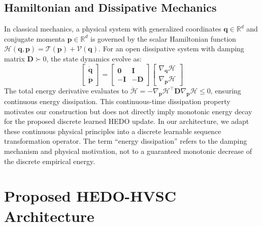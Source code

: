 \documentclass[pdflatex,sn-mathphys-num]{sn-jnl}%
\begin{document}
\subsection{Hamiltonian and Dissipative Mechanics}
In classical mechanics, a physical system with generalized coordinates $\mathbf{q} \in \mathbb{R}^d$ and conjugate momenta $\mathbf{p} \in \mathbb{R}^d$ is governed by the scalar Hamiltonian function $\mathcal{H}(\mathbf{q}, \mathbf{p}) = \mathcal{T}(\mathbf{p}) + \mathcal{V}(\mathbf{q})$. For an open dissipative system with damping matrix $\mathbf{D} \succ 0$, the state dynamics evolve as:
\begin{equation}
\begin{bmatrix} \dot{\mathbf{q}} \\ \dot{\mathbf{p}} \end{bmatrix} = \begin{bmatrix} \mathbf{0} & \mathbf{I} \\ -\mathbf{I} & -\mathbf{D} \end{bmatrix} \begin{bmatrix} \nabla_{\mathbf{q}} \mathcal{H} \\ \nabla_{\mathbf{p}} \mathcal{H} \end{bmatrix}
\end{equation}
The total energy derivative evaluates to $\dot{\mathcal{H}} = -\nabla_{\mathbf{p}}\mathcal{H}^\top \mathbf{D} \nabla_{\mathbf{p}}\mathcal{H} \le 0$, ensuring continuous energy dissipation. This continuous-time dissipation property motivates our construction but does not directly imply monotonic energy decay for the proposed discrete learned HEDO update. In our architecture, we adapt these continuous physical principles into a discrete learnable sequence transformation operator. The term ``energy dissipation'' refers to the damping mechanism and physical motivation, not to a guaranteed monotonic decrease of the discrete empirical energy.

\section{Proposed HEDO-HVSC Architecture}
\label{sec:methodology}
\end{document}
